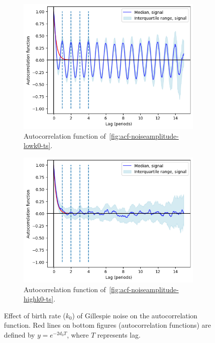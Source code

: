 \begin{figure}
  \begin{subfigure}[t]{0.45\textwidth}
  \centering
    \includegraphics[width=\linewidth]{gillespie_k1_d0p05_acf.png}
    \caption{
      Autocorrelation function of~\ref{fig:acf-noiseamplitude-lowk0-ts}.
    }
    \label{fig:acf-noiseamplitude-lowk0-acf}
  \end{subfigure}%
  \begin{subfigure}[t]{0.45\textwidth}
  \centering
    \includegraphics[width=\linewidth]{gillespie_k25_d0p05_acf.png}
    \caption{
      Autocorrelation function of~\ref{fig:acf-noiseamplitude-highk0-ts}.
    }
    \label{fig:acf-noiseamplitude-highk0-acf}
  \end{subfigure}

  \caption{
    Effect of birth rate ($k_{0}$) of Gillespie noise on the autocorrelation function.
    Red lines on bottom figures (autocorrelation functions) are defined by $y = e^{-2d_{0}T}$, where $T$ represents lag.
  }
  \label{fig:acf-noiseamplitude}
\end{figure}

